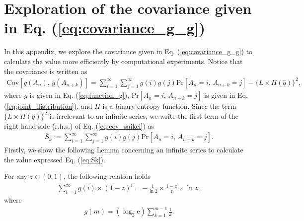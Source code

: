 \newpage
\section{Exploration of the covariance given in Eq. (\ref{eq:covariance_g_g})}\label{appendix:B}
In this appendix, we explore the covariance given in Eq. (\ref{eq:covariance_g_g}) to calculate the value more efficiently by computational experiments. Notice that the covariance is written as 
\begin{align}\label{eq:cov_saikei}
	\mathrm{Cov}[g(A_n),\, g(A_{n+k})] 
	= \sum_{i=1}^{\infty} \sum_{j=1}^{\infty} g(i) g(j) \mathrm{Pr} \left[ A_n=i,\,A_{n+k}=j \right] - \{L\times H(\hat{q})\}^2,
\end{align}
where $g$ is given in Eq. (\ref{eq:function_g}), $\mathrm{Pr} \left[ A_n=i,\,A_{n+k}=j \right]$ is given in Eq. (\ref{eq:joint_distribution}), and $H$ is a binary entropy function.
%
Since the term $\{L\times H(\hat{q})\}^2$ is irrelevant to an infinite series, we write the first term of the right hand side (r.h.s.) of Eq. (\ref{eq:cov_saikei}) as
%
\begin{align}\label{eq:Sk}
	\overline{S}_{k} := \sum_{i=1}^{\infty} \sum_{j=1}^{\infty} g(i) g(j) \mathrm{Pr} \left[ A_n=i,\,A_{n+k}=j \right].
\end{align}
%
Firstly, we show the following Lemma concerning an infinite series to calculate the value expressed Eq. (\ref{eq:Sk}). 
%
\begin{lemma}\label{lemma:1}
For any $z \in (0,1)$, the following relation holds
\begin{align}\label{eq:infinite_series}
	\sum_{i=1}^{\infty} g(i) \times (1-z)^i = -\frac{1}{\ln 2} \times \frac{1-z}{z} \times \ln z,
\end{align}
where
\begin{align}
	g(m) = (\log_2 \mathrm{e}) \sum_{k=1}^{m-1} \frac{1}{k}.
\end{align}
\end{lemma}
